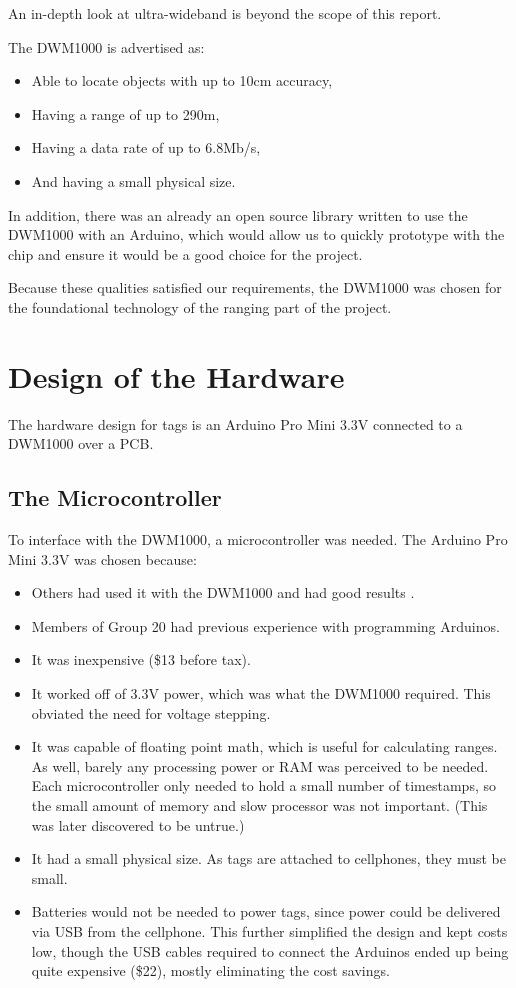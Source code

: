 An in-depth look at ultra-wideband is beyond the scope of this report.

The DWM1000 is advertised as:
\begin{itemize}
	\item Able to locate objects with up to 10cm accuracy,
	\item Having a range of up to 290m,
	\item Having a data rate of up to 6.8Mb/s,
	\item And having a small physical size. 
\end{itemize}

In addition, there was an already an open source library written to use the DWM1000 with an Arduino, which would allow us to quickly prototype with the chip and ensure it would be a good choice for the project.

Because these qualities satisfied our requirements, the DWM1000 was chosen for the foundational technology of the ranging part of the project. 

\section{Design of the Hardware}
The hardware design for tags is an Arduino Pro Mini 3.3V connected to a DWM1000 over a PCB. 

\subsection{The Microcontroller}
To interface with the DWM1000, a microcontroller was needed. The Arduino Pro Mini 3.3V was chosen because:
\begin{itemize}
	\item Others had used it with the DWM1000 and had good results \cite{LPSMini}.
	\item Members of Group 20 had previous experience with programming Arduinos.
	\item It was inexpensive (\$13 before tax).
	\item It worked off of 3.3V power, which was what the DWM1000 required. This obviated the need for voltage stepping.
	\item It was capable of floating point math, which is useful for calculating ranges. As well, barely any processing power or RAM was perceived to be needed. Each microcontroller only needed to hold a small number of timestamps, so the small amount of memory and slow processor was not important. (This was later discovered to be untrue.)
	\item It had a small physical size. As tags are attached to cellphones, they must be small.
	\item Batteries would not be needed to power tags, since power could be delivered via USB from the cellphone. This further simplified the design and kept costs low, though the USB cables required to connect the Arduinos ended up being quite expensive (\$22), mostly eliminating the cost savings.
\end{itemize}

